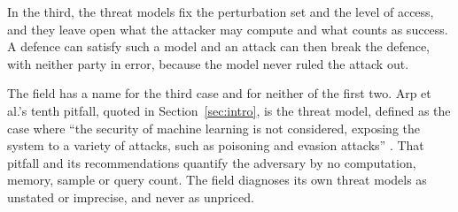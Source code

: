 In the third, the threat models fix the perturbation set and the level of
access, and they leave open what the attacker may compute and what counts as
success. A defence can satisfy such a model and an attack can then break the
defence, with neither party in error, because the model never ruled the attack
out.

The field has a name for the third case and for neither of the first two. Arp
et al.'s tenth pitfall, quoted in Section~\ref{sec:intro}, is the threat
model, defined as the case where ``the security of machine learning is not
considered, exposing the system to a variety of attacks, such as poisoning and
evasion attacks'' \cite{AQPWPWCR22}. That pitfall and its recommendations
quantify the adversary by no computation, memory, sample or query count. The
field diagnoses its own threat models as unstated or imprecise, and never as
unpriced.
